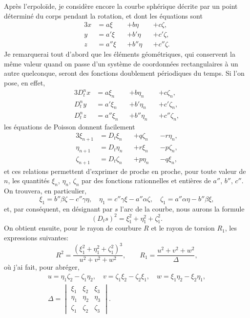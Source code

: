 \documentclass[11pt,leqno,oneside,letterpaper]{book}[2005/09/16]
\begin{document}
Apr\`es l'erpolo\"ide, je consid\`ere encore la courbe sph\'erique d\'ecrite
par un point d\'etermin\'e du corps pendant la rotation, et dont les
\'equations sont
\begin{alignat*}{3}
  x &= a  \xi &&+ b  \eta &&+ c  \zeta, \\
  y &= a' \xi &&+ b' \eta &&+ c' \zeta, \\
  z &= a''\xi &&+ b''\eta &&+ c''\zeta.
\end{alignat*}
Je remarquerai tout d'abord que les \'el\'ements g\'eom\'etriques, qui conservent
la m\^eme valeur quand on passe d'un syst\`eme de coordonn\'ees rectangulaires
\`a un autre quelconque, seront des fonctions doublement p\'eriodiques
du temps. Si l'on pose, en effet,
\begin{alignat*}{3}
  D^n_t x &= a  \xi_n &&+ b  \eta_n &&+ c\zeta_n, \\
  D^n_t y &= a' \xi_n &&+ b' \eta_n &&+ c'\zeta_n, \\
  D^n_t z &= a''\xi_n &&+ b''\eta_n &&+ c''\zeta_n,
\end{alignat*}
les \'equations de Poisson donnent facilement
\begin{alignat*}{3}
  \xi_{n+1}  &= D_t \xi_n   &&+ q\zeta_n &&- r\eta_n, \\
  \eta_{n+1} &= D_t \eta_n  &&+ r\xi_n   &&- p\zeta_n, \\
  \zeta_{n+1}&= D_t \zeta_n &&+ p\eta_n  &&- q\xi_n,
\end{alignat*}
et ces relations permettent d'exprimer de proche en proche, pour toute
valeur de $n$, les quantit\'es $\xi_n$, $\eta_n$, $\zeta_n$ par des fonctions rationnelles et enti\`eres
de $a''$, $b''$, $c''$. On trouvera, en particulier,
\[
  \xi_1  = b''\beta\zeta - c''\gamma\eta, \quad
  \eta_1 = c''\gamma\xi  - a''\alpha\zeta, \quad
  \zeta_1= a''\alpha\eta - b''\beta\xi,
\]
et, par cons\'equent, en d\'esignant par $s$ l'arc de la courbe, nous aurons la
formule
\[
(D_t s)^2 = \xi_1^2 + \eta_1^2 + \zeta_1^2.
\]
On obtient ensuite, pour le rayon de courbure $R$ et le rayon de torsion $R_1$,
les expressions suivantes:
\[
R^2 = \frac{(\xi_1^2 + \eta_1^2 + \zeta_1^2)^3}{u^2 + v^2 + w^2},
\qquad
R_1 = \frac{u^2 + v^2 + w^2}{\Delta},
\]
o\`u j'ai fait, pour abr\'eger,
\begin{gather*}
  u =  \eta_1\zeta_2 - \zeta_1\eta_2,  \quad
  v = \zeta_1  \xi_2 - \zeta_2 \xi_1,  \quad
  w =   \xi_1 \eta_2 -   \xi_2\eta_1,
\\
  \Delta =
  \begin{vmatrix}
    \xi_1   & \xi_2   & \xi_3   \\
    \eta_1  & \eta_2  & \eta_3  \\
    \zeta_1 & \zeta_2 & \zeta_3
  \end{vmatrix}
.
\end{gather*}
\end{document}
